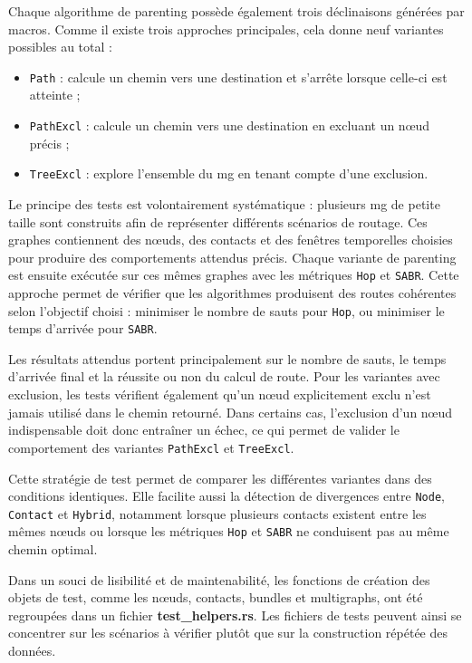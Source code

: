 \documentclass{article}
\begin{document}
Chaque algorithme de parenting possède également trois déclinaisons générées par macros. Comme il existe trois approches principales, cela donne neuf variantes possibles au total :

\begin{itemize}
    \item \texttt{Path} : calcule un chemin vers une destination et s'arrête lorsque celle-ci est atteinte ;
    \item \texttt{PathExcl} : calcule un chemin vers une destination en excluant un nœud précis ;
    \item \texttt{TreeExcl} : explore l'ensemble du \gls{mg} en tenant compte d'une exclusion.
\end{itemize}

Le principe des tests est volontairement systématique : plusieurs \gls{mg} de petite taille sont construits afin de représenter différents scénarios de routage. Ces graphes contiennent des nœuds, des contacts et des fenêtres temporelles choisies pour produire des comportements attendus précis. Chaque variante de parenting est ensuite exécutée sur ces mêmes graphes avec les métriques \texttt{Hop} et \texttt{SABR}. Cette approche permet de vérifier que les algorithmes produisent des routes cohérentes selon l’objectif choisi : minimiser le nombre de sauts pour \texttt{Hop}, ou minimiser le temps d’arrivée pour \texttt{SABR}.

Les résultats attendus portent principalement sur le nombre de sauts, le temps d’arrivée final et la réussite ou non du calcul de route. Pour les variantes avec exclusion, les tests vérifient également qu’un nœud explicitement exclu n’est jamais utilisé dans le chemin retourné. Dans certains cas, l’exclusion d’un nœud indispensable doit donc entraîner un échec, ce qui permet de valider le comportement des variantes \texttt{PathExcl} et \texttt{TreeExcl}.

Cette stratégie de test permet de comparer les différentes variantes dans des conditions identiques. Elle facilite aussi la détection de divergences entre \texttt{Node}, \texttt{Contact} et \texttt{Hybrid}, notamment lorsque plusieurs contacts existent entre les mêmes nœuds ou lorsque les métriques \texttt{Hop} et \texttt{SABR} ne conduisent pas au même chemin optimal.

Dans un souci de lisibilité et de maintenabilité, les fonctions de création des objets de test, comme les nœuds, contacts, bundles et multigraphs, ont été regroupées dans un fichier \textbf{test\_helpers.rs}. Les fichiers de tests peuvent ainsi se concentrer sur les scénarios à vérifier plutôt que sur la construction répétée des données.\\
\end{document}

